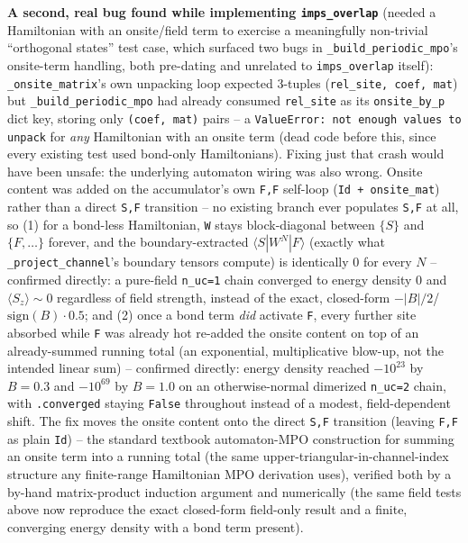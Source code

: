 \documentclass[11pt]{article}
\begin{document}
\textbf{A second, real bug found while implementing \texttt{imps\_overlap}}
(needed a Hamiltonian with an onsite/field term to exercise a
meaningfully non-trivial ``orthogonal states'' test case, which
surfaced two bugs in \texttt{\_build\_periodic\_mpo}'s onsite-term
handling, both pre-dating and unrelated to \texttt{imps\_overlap}
itself): \texttt{\_onsite\_matrix}'s own unpacking loop expected
3-tuples (\texttt{rel\_site, coef, mat}) but \texttt{\_build\_periodic\_mpo}
had already consumed \texttt{rel\_site} as its \texttt{onsite\_by\_p}
dict key, storing only \texttt{(coef, mat)} pairs -- a
\texttt{ValueError: not enough values to unpack} for \emph{any}
Hamiltonian with an onsite term (dead code before this, since every
existing test used bond-only Hamiltonians). Fixing just that crash
would have been unsafe: the underlying automaton wiring was also wrong.
Onsite content was added on the accumulator's own \texttt{F,F}
self-loop (\texttt{Id + onsite\_mat}) rather than a direct
\texttt{S,F} transition -- no existing branch ever populates
\texttt{S,F} at all, so (1) for a bond-less Hamiltonian, \texttt{W}
stays block-diagonal between $\{S\}$ and $\{F,\ldots\}$ forever, and the
boundary-extracted $\langle S|W^N|F\rangle$ (exactly what
\texttt{\_project\_channel}'s boundary tensors compute) is identically
0 for every $N$ -- confirmed directly: a pure-field \texttt{n\_uc=1}
chain converged to energy density 0 and $\langle S_z\rangle\sim0$
regardless of field strength, instead of the exact, closed-form
$-|B|/2$/$\mathrm{sign}(B)\cdot0.5$; and (2) once a bond term \emph{did}
activate \texttt{F}, every further site absorbed while \texttt{F} was
already hot re-added the onsite content on top of an already-summed
running total (an exponential, multiplicative blow-up, not the intended
linear sum) -- confirmed directly: energy density reached $-10^{23}$ by
$B=0.3$ and $-10^{69}$ by $B=1.0$ on an otherwise-normal dimerized
\texttt{n\_uc=2} chain, with \texttt{.converged} staying \texttt{False}
throughout instead of a modest, field-dependent shift. The fix moves
the onsite content onto the direct \texttt{S,F} transition (leaving
\texttt{F,F} as plain \texttt{Id}) -- the standard textbook
automaton-MPO construction for summing an onsite term into a running
total (the same upper-triangular-in-channel-index structure any
finite-range Hamiltonian MPO derivation uses), verified both by a
by-hand matrix-product induction argument and numerically (the same
field tests above now reproduce the exact closed-form field-only result
and a finite, converging energy density with a bond term present).
\end{document}
